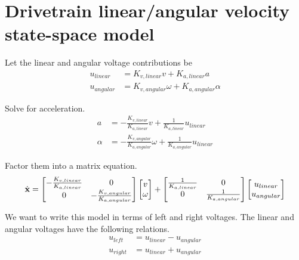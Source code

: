 \section{Drivetrain linear/angular velocity state-space model}

Let the linear and angular voltage contributions be
\begin{align*}
  u_{linear} &= K_{v,linear} v + K_{a,linear} a \\
  u_{angular} &= K_{v,angular} \omega + K_{a,angular} \alpha
\end{align*}

Solve for acceleration.
\begin{align*}
  a &= -\frac{K_{v,linear}}{K_{a,linear}} v + \frac{1}{K_{a,linear}} u_{linear} \\
  \alpha &= -\frac{K_{v,angular}}{K_{a,angular}} \omega + \frac{1}{K_{a,angular}} u_{linear}
\end{align*}

Factor them into a matrix equation.
\begin{equation*}
  \dot{\mathbf{x}} =
  \begin{bmatrix}
    -\frac{K_{v,linear}}{K_{a,linear}} & 0 \\
    0 & -\frac{K_{v,angular}}{K_{a,angular}}
  \end{bmatrix}
  \begin{bmatrix}
    v \\
    \omega
  \end{bmatrix} +
  \begin{bmatrix}
    \frac{1}{K_{a,linear}} & 0 \\
    0 & \frac{1}{K_{a,angular}}
  \end{bmatrix}
  \begin{bmatrix}
    u_{linear} \\
    u_{angular}
  \end{bmatrix}
\end{equation*}

We want to write this model in terms of left and right voltages. The linear and
angular voltages have the following relations.
\begin{align*}
  u_{left} &= u_{linear} - u_{angular} \\
  u_{right} &= u_{linear} + u_{angular}
\end{align*}

